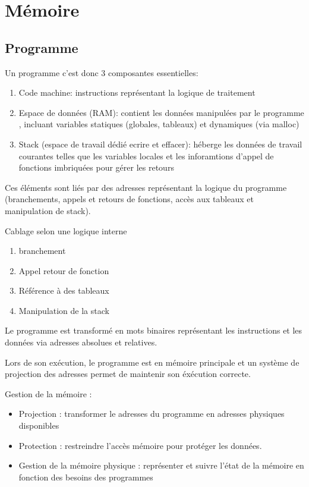 \section{Mémoire}\label{sec:memoire}

\subsection{Programme}
Un programme c'est donc 3 composantes essentielles:
\begin{enumerate}
    \item Code machine: instructions représentant la logique de traitement
    \item Espace de données (RAM): contient les données manipulées par le programme , incluant variables statiques (globales, tableaux) et dynamiques (via malloc)
    \item Stack (espace de travail dédié ecrire et effacer): héberge les données de travail courantes telles que les variables locales et les inforamtions d'appel de fonctions imbriquées pour gérer les retours
\end{enumerate}
Ces éléments sont liés par des adresses représentant la logique du programme (branchements, appels et retours de fonctions, accès aux tableaux et manipulation de stack).

Cablage selon une logique interne
\begin{enumerate}
    \item branchement
    \item Appel retour de fonction
    \item Référence à des tableaux
    \item Manipulation de la stack
\end{enumerate}

Le programme est transformé en mots binaires représentant les instructions et les données via adresses absolues et relatives.

Lors de son exécution, le programme est en mémoire principale et un système de projection des adresses permet de maintenir son éxécution correcte.

Gestion de la mémoire :
\begin{itemize}
    \item Projection : transformer le adresses du programme en adresses physiques disponibles
    \item Protection : restreindre l'accès mémoire pour protéger les données.
    \item Gestion de la mémoire physique : représenter et suivre l'état de la mémoire en fonction des besoins des programmes
\end{itemize}

